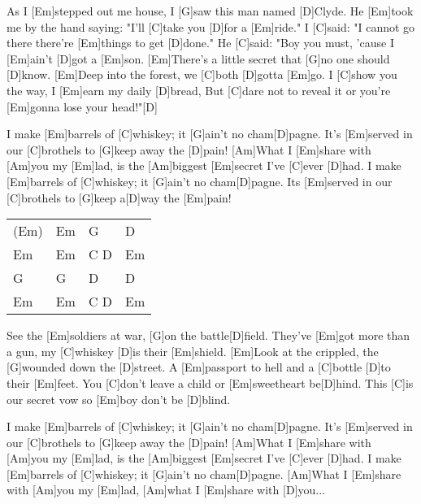 

\begin{guitar}
	
	As I [Em]stepped out me house, I [G]saw this man named [D]Clyde. 
	He [Em]took me by the hand saying: "I'll [C]take you [D]for a [Em]ride." 
	I [C]said: "I cannot go there there're [Em]things to get [D]done." 
	He [C]said: "Boy you must, 'cause I [Em]ain't [D]got a [Em]son.
	[Em]There's a little secret that [G]no one should [D]know.
	[Em]Deep into the forest, we [C]both [D]gotta [Em]go.
	I [C]show you the way, I [Em]earn my daily [D]bread,
	But [C]dare not to reveal it or you're [Em]gonna lose your head!"[D]{}
	
	I make [Em]barrels of [C]whiskey; it [G]ain't no cham[D]pagne.
	It's [Em]served in our [C]brothels to [G]keep away the [D]pain! 
	[Am]What I [Em]share with [Am]you my [Em]lad, is the [Am]biggest [Em]secret I've [C]ever [D]had. 
	I make [Em]barrels of [C]whiskey; it [G]ain't no cham[D]pagne.
	Its [Em]served in our [C]brothels to [G]keep a[D]way the [Em]pain! 
	
	{\footnotesize\begin{tabular}{l|l|l|l}
			(Em) & Em & G & D \\
			Em & Em & C D & Em\\
			G & G & D & D\\
			Em & Em & C D & Em 
	\end{tabular}}
	
	See the [Em]soldiers at war, [G]on the battle[D]field.
	They've [Em]got more than a gun, my [C]whiskey [D]is their [Em]shield.
	[Em]Look at the crippled, the [G]wounded down the [D]street.
	A [Em]passport to hell and a [C]bottle [D]to their [Em]feet.
	You [C]don't leave a child or [Em]sweetheart be[D]hind.
	This [C]is our secret vow so [Em]boy don't be [D]blind.
	\pagebreak
	
	I make [Em]barrels of [C]whiskey; it [G]ain't no cham[D]pagne.
	It's [Em]served in our [C]brothels to [G]keep away the [D]pain!
	[Am]What I [Em]share with [Am]you my [Em]lad, is the [Am]biggest [Em]secret I've [C]ever [D]had.
	I make [Em]barrels of [C]whiskey; it [G]ain't no cham[D]pagne.
	[Am]What I [Em]share with [Am]you my [Em]lad, [Am]what I [Em]share with [D]you... 
	
	 
\end{guitar}
